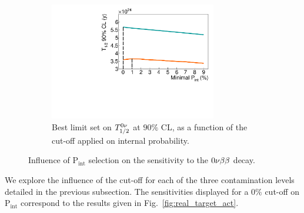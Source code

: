 \begin{figure}[!h]
\begin{subfigure}[t]{0.7\textwidth}
  \includegraphics[width=0.8\textwidth]{Sensitivity/fig_sensitivity/cont_cut_T12_B.pdf}
  \captionsetup{justification=centering}
  \caption{Best limit set on $T_{1/2}^{0\nu}$ at $90\%$ CL, as a function of the cut-off applied on internal probability.
    \label{subfig:cont_Pint_T12}}
\end{subfigure}
  \caption{Influence of P$_{\text{int}}$ selection on the sensitivity to the $0\nu\beta\beta$ decay.
    \label{fig:cont_Pint_T12}}
\end{figure}
We explore the influence of the cut-off for each of the three contamination levels detailed in the previous subsection.
The sensitivities displayed for a $0\%$ cut-off on P$_{\text{int}}$ correspond to the results given in Fig.~\ref{fig:real_target_act}.


